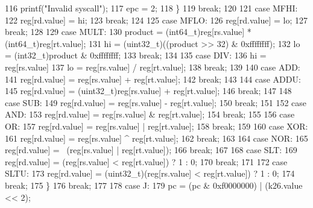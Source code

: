 \begin{DoxyCode}
{{116                 printf(\textcolor{stringliteral}{"Invalid syscall"});
117                 epc = 2;
118             \}
119             \textcolor{keywordflow}{break};
120 
121         \textcolor{keywordflow}{case} MFHI:
122             reg[rd.value] = hi;
123             \textcolor{keywordflow}{break};
124 
125         \textcolor{keywordflow}{case} MFLO:
126             reg[rd.value] = lo;
127             \textcolor{keywordflow}{break};
128 
129         \textcolor{keywordflow}{case} MULT:
130             product = (int64\_t)reg[rs.value] * (int64\_t)reg[rt.value];
131             hi = (uint32\_t)((product >> 32) & 0xffffffff);
132             lo = (int32\_t)product & 0xffffffff;
133             \textcolor{keywordflow}{break};
134 
135         \textcolor{keywordflow}{case} DIV:
136             hi = reg[rs.value] %
137             lo = reg[rs.value] / reg[rt.value];
138             \textcolor{keywordflow}{break};
139 
140         \textcolor{keywordflow}{case} ADD:
141             reg[rd.value] = reg[rs.value] + reg[rt.value];
142             \textcolor{keywordflow}{break};
143 
144         \textcolor{keywordflow}{case} ADDU:
145             reg[rd.value] = (uint32\_t)reg[rs.value] + reg[rt.value];
146             \textcolor{keywordflow}{break};
147 
148         \textcolor{keywordflow}{case} SUB:
149             reg[rd.value] = reg[rs.value] - reg[rt.value];
150             \textcolor{keywordflow}{break};
151 
152         \textcolor{keywordflow}{case} AND:
153             reg[rd.value] = reg[rs.value] & reg[rt.value];
154             \textcolor{keywordflow}{break};
155 
156         \textcolor{keywordflow}{case} OR:
157             reg[rd.value] = reg[rs.value] | reg[rt.value];
158             \textcolor{keywordflow}{break};
159 
160         \textcolor{keywordflow}{case} XOR:
161             reg[rd.value] = reg[rs.value] ^ reg[rt.value];
162             \textcolor{keywordflow}{break};
163 
164         \textcolor{keywordflow}{case} NOR:
165             reg[rd.value] = ~(reg[rs.value] | reg[rt.value]);
166             \textcolor{keywordflow}{break};
167 
168         \textcolor{keywordflow}{case} SLT:
169             reg[rd.value] = (reg[rs.value] < reg[rt.value]) ? 1 : 0;
170             \textcolor{keywordflow}{break};
171 
172         \textcolor{keywordflow}{case} SLTU:
173             reg[rd.value] = (uint32\_t)(reg[rs.value] < reg[rt.value]) ? 1 : 0;
174             \textcolor{keywordflow}{break};
175         \}
176         \textcolor{keywordflow}{break};
177 
178     \textcolor{keywordflow}{case} J:
179         pc = (pc & 0xf0000000) | (k26.value << 2);
}}
\end{DoxyCode}
